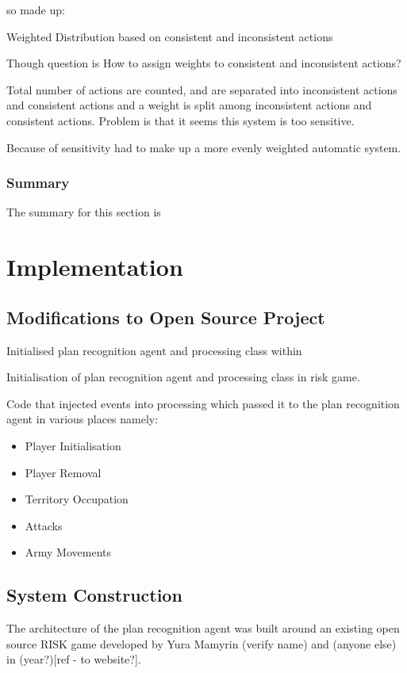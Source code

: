 \documentclass[parskip]{cs4rep}
\begin{document}
so made up:

Weighted Distribution based on consistent and inconsistent actions

Though question is How to assign weights to consistent and inconsistent actions?

Total number of actions are counted, and are separated into inconsistent actions and consistent actions and a weight is split among inconsistent actions and consistent actions. Problem is that it seems this system is too sensitive.

Because of sensitivity had to make up a more evenly weighted automatic system.

\subsection{Summary}

The summary for this section is

\chapter{Implementation}

\section{Modifications to Open Source Project}

Initialised plan recognition agent and processing class within 

Initialisation of plan recognition agent and processing class in risk game.

Code that injected events into processing which passed it to the plan recognition agent in various places namely:

\begin{itemize}
\item
Player Initialisation
\item
Player Removal
\item
Territory Occupation
\item
Attacks
\item
Army Movements
\end{itemize}

\section{System Construction}

The architecture of the plan recognition agent was built around an existing open source RISK game developed by Yura Mamyrin (verify name) and (anyone else) in (year?)[ref - to website?].
\end{document}

